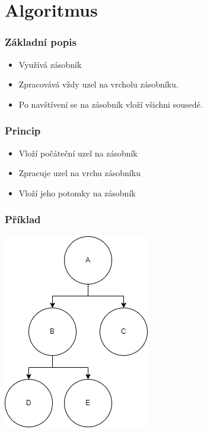 \documentclass{beamer}
\begin{document}
\section{Algoritmus}

\begin{frame}
    \frametitle{Základní popis}
    \begin{itemize}
        \item Využívá zásobník
        \item Zpracovává vždy uzel na vrcholu zásobníku.
        \item Po navštívení se na zásobník vloží všichni sousedé.
    \end{itemize}
\end{frame}

\begin{frame}
    \frametitle{Princip}
    \begin{itemize}
        \item Vloží počáteční uzel na zásobník
        \item Zpracuje uzel na vrchu zásobníku
        \item Vloží jeho potomky na zásobník
    \end{itemize}
\end{frame}

\begin{frame}
    \frametitle{Příklad}
    \begin{center}
        \includegraphics[totalheight=180pt, width=\textwidth, keepaspectratio]{dia.png}
    \end{center}
\end{frame}
\end{document}
